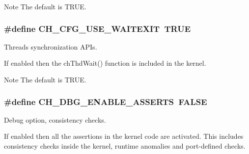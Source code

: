 \begin{DoxyNote}{Note}
The default is {\ttfamily T\+R\+U\+E}. 
\end{DoxyNote}
\hypertarget{group__config_ga2e46052c737bba99ac4b45f834149fc4}{
\subsubsection[{C\+H\+\_\+\+C\+F\+G\+\_\+\+U\+S\+E\+\_\+\+W\+A\+I\+T\+E\+X\+I\+T}]{\setlength{\rightskip}{0pt plus 5cm}\#define C\+H\+\_\+\+C\+F\+G\+\_\+\+U\+S\+E\+\_\+\+W\+A\+I\+T\+E\+X\+I\+T~T\+R\+U\+E}}\label{group__config_ga2e46052c737bba99ac4b45f834149fc4}


Threads synchronization A\+P\+Is. 

If enabled then the {\ttfamily ch\+Thd\+Wait()} function is included in the kernel.

\begin{DoxyNote}{Note}
The default is {\ttfamily T\+R\+U\+E}. 
\end{DoxyNote}
\hypertarget{group__config_gad602fd2546073869a10859158d865b9b}{
\subsubsection[{C\+H\+\_\+\+D\+B\+G\+\_\+\+E\+N\+A\+B\+L\+E\+\_\+\+A\+S\+S\+E\+R\+T\+S}]{\setlength{\rightskip}{0pt plus 5cm}\#define C\+H\+\_\+\+D\+B\+G\+\_\+\+E\+N\+A\+B\+L\+E\+\_\+\+A\+S\+S\+E\+R\+T\+S~F\+A\+L\+S\+E}}\label{group__config_gad602fd2546073869a10859158d865b9b}


Debug option, consistency checks. 

If enabled then all the assertions in the kernel code are activated. This includes consistency checks inside the kernel, runtime anomalies and port-\/defined checks.

